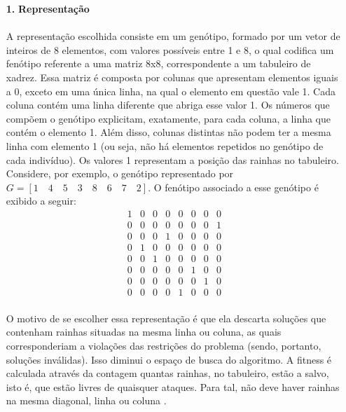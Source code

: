 \documentclass{report}
\begin{document}
	\begin{itemize}
		\item[\textbf{1.}] \textbf{Representação}
		
		\paragraph{} A representação escolhida consiste em um genótipo, formado por um vetor de inteiros de 8 elementos, com valores possíveis entre 1 e 8, o qual codifica um fenótipo referente a uma matriz 8x8, correspondente a um tabuleiro de xadrez. Essa matriz é composta por colunas que apresentam elementos iguais a 0, exceto em uma única linha, na qual o elemento em questão vale 1. Cada coluna contém uma linha diferente que abriga esse valor 1. Os números que compõem o genótipo explicitam, exatamente, para cada coluna, a linha que contém o elemento 1. Além disso, colunas distintas não podem ter a mesma linha com elemento 1 (ou seja, não há elementos repetidos no genótipo de cada indivíduo). Os valores 1 representam a posição das rainhas no tabuleiro. Considere, por exemplo, o genótipo representado por $G = [1 \quad 4 \quad 5 \quad 3 \quad 8 \quad 6 \quad 7 \quad 2]$. O fenótipo associado a esse genótipo é exibido a seguir:\\
		
		\begin{equation*}
		\begin{array}{cccccccc}
		1 & 0 & 0 & 0 & 0 & 0 & 0 & 0 \\ 
		0 & 0 & 0 & 0 & 0 & 0 & 0 & 1 \\ 
		0 & 0 & 0 & 1 & 0 & 0 & 0 & 0 \\ 
		0 & 1 & 0 & 0 & 0 & 0 & 0 & 0 \\ 
		0 & 0 & 1 & 0 & 0 & 0 & 0 & 0 \\ 
		0 & 0 & 0 & 0 & 0 & 1 & 0 & 0 \\ 
		0 & 0 & 0 & 0 & 0 & 0 & 1 & 0 \\ 
		0 & 0 & 0 & 0 & 1 & 0 & 0 & 0
		\end{array} 
		\end{equation*}
		
		\paragraph{} O motivo de se escolher essa representação é que ela descarta soluções que contenham rainhas situadas na mesma linha ou coluna, as quais corresponderiam a violações das restrições do problema (sendo, portanto, soluções inválidas). Isso diminui o espaço de busca do algoritmo. A fitness é calculada através da contagem quantas rainhas, no tabuleiro, estão a salvo, isto é, que estão livres de quaisquer ataques. Para tal, não deve haver rainhas na mesma diagonal, linha ou coluna .\\
		

\end{itemize}
\end{document}
